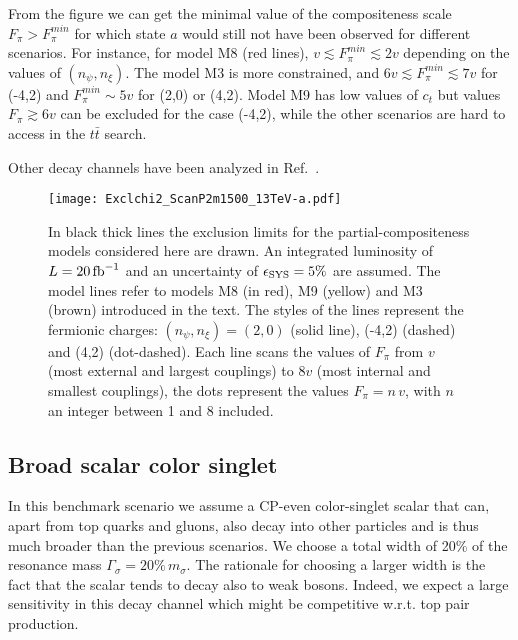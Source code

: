 \documentclass[aps,prd,amsmath,amssymb,superscriptaddress, preprintnumbers,preprint,nofootinbib,a4paper]{revtex4}
\newcommand{\ifb}{\,{\rm fb}^{-1}}
\newcommand{\ttb}{t\bar{t}}
\begin{document}
From the figure we can get the minimal value of the compositeness scale $F_\pi>F_\pi^{min}$ for which state $a$ would still not have been observed for different scenarios. For instance, for model M8 (red lines), $v\lesssim F_\pi^{min}\lesssim 2v$ depending on the values of $(n_\psi,n_\xi)$. The model M3 is more constrained, and $6v\lesssim F_\pi^{min}\lesssim 7v$ for (-4,2) and $F_\pi^{min}\sim 5v$ for (2,0) or (4,2).
Model M9 has low values of $c_t$ but values $ F_\pi\gtrsim 6v$ can be excluded  for the case  (-4,2), while the other scenarios are hard to access in the $\ttb$ search.

Other decay channels have been analyzed in Ref.~\cite{Belyaev:2016ftv}.

\begin{figure}[H]
\begin{center}
\texttt{[image: Exclchi2\_ScanP2m1500\_13TeV-a.pdf]}  
\end{center}
\caption{In black thick lines the exclusion limits for the partial-compositeness models considered here are drawn. An integrated luminosity of $L=20\ifb$ and an
  uncertainty of $\epsilon_{\rm SYS}=5\%$ are assumed. The model lines refer to models M8 (in red), M9 (yellow) and M3 (brown)
  introduced in the text. The styles of the lines represent the fermionic charges: $(n_\psi,n_\xi)=(2,0)$ (solid line),
  (-4,2) (dashed) and (4,2) (dot-dashed). Each line scans the values of $F_\pi$ from $v$ (most external and largest couplings)
  to $8v$ (most internal and smallest couplings), the dots represent the values $F_\pi=n\,v$, with $n$ an integer between 1 and 8 included.}
\label{fig:Exclm1500-model}
\end{figure}


\subsection{Broad scalar color singlet}

In this benchmark scenario we assume a CP-even color-singlet scalar that can, apart from top quarks and gluons, also decay into other particles and
is thus much broader than the previous scenarios. We choose a total width of 20\% of the resonance mass $\Gamma_\sigma=20\%\, m_\sigma$.
The rationale for choosing a larger width is the fact that the scalar tends to decay also to weak bosons. Indeed, we expect a large sensitivity in this decay channel which might be competitive w.r.t. top pair production.
\end{document}
